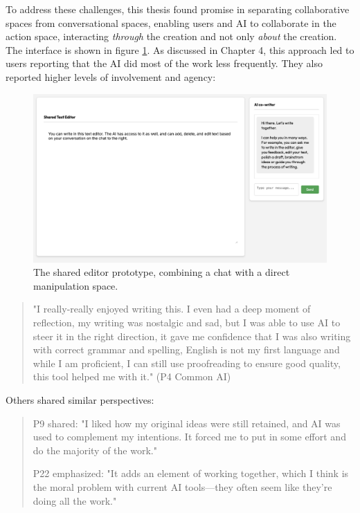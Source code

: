To address these challenges, this thesis found promise in separating collaborative spaces from conversational spaces, enabling users and AI to collaborate in the action space, interacting \textit{through} the creation and not only \textit{about} the creation. The interface is shown in figure \ref{fig:shared-editor}. As discussed in Chapter 4, this approach led to users reporting that the AI did most of the work less frequently. They also reported higher levels of involvement and agency:


\begin{figure}[H]
    \centering
    \includegraphics[width=1\linewidth]{sharededitor.png}
    \caption{The shared editor prototype, combining a chat with a direct manipulation space.}
    \label{fig:shared-editor}
\end{figure}

\begin{quote}
"I really-really enjoyed writing this. I even had a deep moment of reflection, my writing was nostalgic and sad, but I was able to use AI to steer it in the right direction, it gave me confidence that I was also writing with correct grammar and spelling, English is not my first language and while I am proficient, I can still use proofreading to ensure good quality, this tool helped me with it." (P4 Common AI)
\end{quote}

Others shared similar perspectives:

\begin{quote}
P9 shared: "I liked how my original ideas were still retained, and AI was used to complement my intentions. It forced me to put in some effort and do the majority of the work."

P22 emphasized: "It adds an element of working together, which I think is the moral problem with current AI tools—they often seem like they're doing all the work."
\end{quote}

